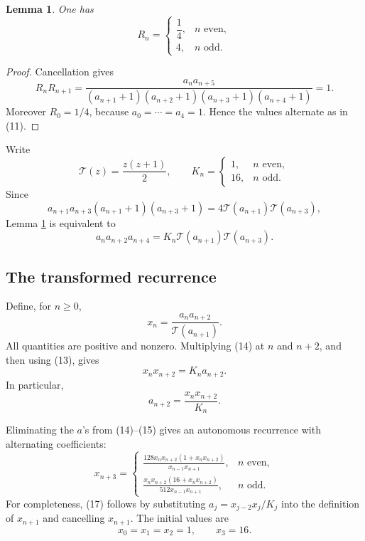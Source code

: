 \documentclass[11pt]{article}
\newtheorem{lemma}[theorem]{Lemma}
\theoremstyle{remark}
\begin{document}
\begin{lemma}\label{lem:R}
One has
\[
 R_n=
 \begin{cases}
 \dfrac14,&n\text{ even},\\[2mm]
 4,&n\text{ odd}.
 \end{cases}                                                     \tag{11}
\]
\end{lemma}

\begin{proof}
Cancellation gives
\[
 R_nR_{n+1}
 =\frac{a_na_{n+5}}
 {(a_{n+1}+1)(a_{n+2}+1)(a_{n+3}+1)(a_{n+4}+1)}=1.
\]
Moreover $R_0=1/4$, because $a_0=\cdots=a_4=1$.  Hence the values
alternate as in (11).
\end{proof}

Write
\[
 \mathcal T(z)=\frac{z(z+1)}2,
 \qquad
 K_n=\begin{cases}1,&n\text{ even},\\16,&n\text{ odd}.
       \end{cases}                                                \tag{12}
\]
Since
\[
 a_{n+1}a_{n+3}(a_{n+1}+1)(a_{n+3}+1)
 =4\mathcal T(a_{n+1})\mathcal T(a_{n+3}),
\]
Lemma \ref{lem:R} is equivalent to
\[
 a_na_{n+2}a_{n+4}
 =K_n\mathcal T(a_{n+1})\mathcal T(a_{n+3}).                    \tag{13}
\]

\subsection{The transformed recurrence}

Define, for $n\geq0$,
\[
 x_n=\frac{a_na_{n+2}}{\mathcal T(a_{n+1})}.                    \tag{14}
\]
All quantities are positive and nonzero.  Multiplying (14) at $n$ and
$n+2$, and then using (13), gives
\[
 x_nx_{n+2}=K_na_{n+2}.                                         \tag{15}
\]
In particular,
\[
 a_{n+2}=\frac{x_nx_{n+2}}{K_n}.                                \tag{16}
\]

Eliminating the $a$'s from (14)--(15) gives an autonomous recurrence with
alternating coefficients:
\[
 x_{n+3}=
 \begin{cases}
 \displaystyle
 \frac{128x_nx_{n+2}(1+x_nx_{n+2})}
      {x_{n-1}x_{n+1}},&n\text{ even},\\[4mm]
 \displaystyle
 \frac{x_nx_{n+2}(16+x_nx_{n+2})}
      {512x_{n-1}x_{n+1}},&n\text{ odd}.
 \end{cases}                                                     \tag{17}
\]
For completeness, (17) follows by substituting
$a_j=x_{j-2}x_j/K_j$ into the definition of $x_{n+1}$ and cancelling
$x_{n+1}$.  The initial values are
\[
 x_0=x_1=x_2=1,
 \qquad x_3=16.                                                   \tag{18}
\]
\end{document}
